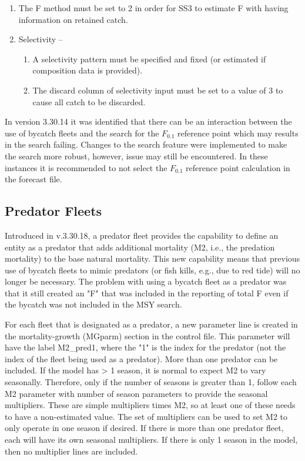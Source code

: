 \begin{enumerate}
	\item The F method must be set to 2 in order for SS3 to estimate F with having information on retained catch.
	\item Selectivity – 
	\begin{enumerate}
		\item A selectivity pattern must be specified and fixed (or estimated if composition data is provided).
		\item The discard column of selectivity input must be set to a value of 3 to cause all catch to be discarded.
	\end{enumerate}	
\end{enumerate}

In version 3.30.14 it was identified that there can be an interaction between the use of bycatch fleets and the search for the $F_{0.1}$ reference point which may results in the search failing.  Changes to the search feature were implemented to make the search more robust, however, issue may still be encountered. In these instances it is recommended to not select the $F_{0.1}$ reference point calculation in the forecast file.

\subsection{Predator Fleets}

Introduced in v.3.30.18, a predator fleet provides the capability to define an entity as a predator that adds additional mortality (M2, i.e., the predation mortality) to the base natural mortality. This new capability means that previous use of bycatch fleets to mimic predators (or fish kills, e.g., due to red tide) will no longer be necessary. The problem with using a bycatch fleet as a predator was that it still created an "F" that was included in the reporting of total F even if the bycatch was not included in the MSY search.

For each fleet that is designated as a predator, a new parameter line is created in the mortality-growth (MGparm) section in the control file. This parameter will have the label M2\_pred1, where the "1" is the index for the predator (not the index of the fleet being used as a predator). More than one predator can be included. If the model has > 1 season, it is normal to expect M2 to vary seasonally. Therefore, only if the number of seasons is greater than 1, follow each M2 parameter with number of season parameters to provide the seasonal multipliers. These are simple multipliers times M2, so at least one of these needs to have a non-estimated value. The set of multipliers can be used to set M2 to only operate in one season if desired. If there is more than one predator fleet, each will have its own seasonal multipliers. If there is only 1 season in the model, then no multiplier lines are included.

